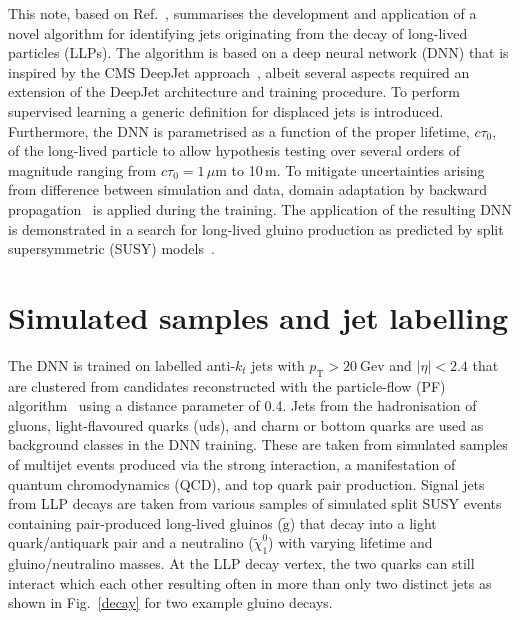 \documentclass{webofc}
\newcommand{\tauo}{\ensuremath{c\tau_{0}}\xspace}
\newcommand{\ctau}{\ensuremath{c\tau_{0}}\xspace}
\newcommand{\gluino}{\ensuremath{\tilde{\textrm{g}}}\xspace}
\newcommand{\lsp}{\ensuremath{\tilde{\chi}_{1}^{0}}\xspace}
\newcommand{\pt}{\ensuremath{p_\textrm{T}}\xspace}
\begin{document}
This note, based on Ref.~\cite{CMS-EXO-19-011}, summarises the development and application of a novel algorithm for identifying jets originating from the decay of long-lived particles (LLPs). The algorithm is based on a deep neural network (DNN) that is inspired by the CMS DeepJet approach~\cite{dj}, albeit several aspects required an extension of the DeepJet architecture and training procedure. To perform supervised learning a generic definition for displaced jets is introduced. Furthermore, the DNN is parametrised as a function of the proper lifetime, \tauo, of the long-lived particle to allow hypothesis testing over several orders of magnitude ranging from $\ctau = 1\,\mu\textrm{m}$ to 10\,m. To mitigate uncertainties arising from difference between simulation and data, domain adaptation by backward propagation~\cite{da} is applied during the training. The application of the resulting DNN is demonstrated in a search for long-lived gluino production as predicted by split supersymmetric (SUSY) models~\cite{splitsusy}.

\section{Simulated samples and jet labelling}
\label{samples}

The DNN is trained on labelled anti-$k_t$ jets with $\pt>20~\mathrm{Gev}$ and $|\eta|<2.4$ that are clustered from candidates reconstructed with the particle-flow (PF) algorithm~\cite{pf} using a distance parameter of 0.4. Jets from the hadronisation of gluons, light-flavoured quarks (uds), and charm or bottom quarks are used as background classes in the DNN training. These are taken from simulated samples of multijet events produced via the strong interaction, a manifestation of quantum chromodynamics (QCD), and top quark pair production. Signal jets from LLP decays are taken from various samples of simulated split SUSY events containing pair-produced long-lived gluinos (\gluino) that decay into a light quark/antiquark pair and a neutralino (\lsp) with varying lifetime and gluino/neutralino masses. At the LLP decay vertex, the two quarks can still interact which each other resulting often in more than only two distinct jets as shown in Fig.~\ref{decay} for two example gluino decays.
\end{document}
